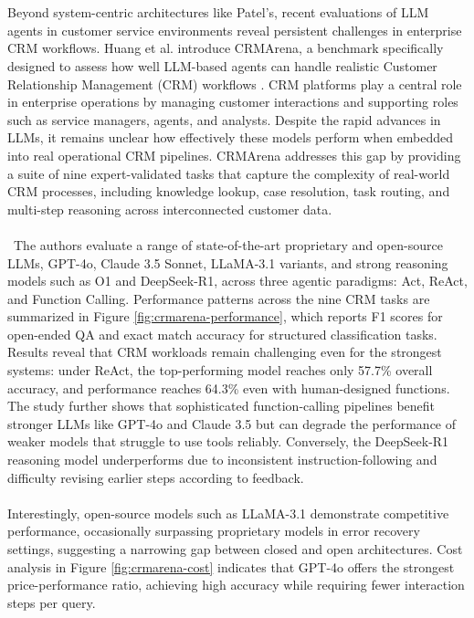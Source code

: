 \\\\
Beyond system-centric architectures like Patel's, recent evaluations of LLM agents in customer service environments reveal persistent challenges in enterprise CRM workflows. Huang et al. introduce CRMArena, a benchmark specifically designed to assess how well LLM-based agents can handle realistic Customer Relationship Management (CRM) workflows \cite{Huang}. CRM platforms play a central role in enterprise operations by managing customer interactions and supporting roles such as service managers, agents, and analysts. Despite the rapid advances in LLMs, it remains unclear how effectively these models perform when embedded into real operational CRM pipelines. CRMArena addresses this gap by providing a suite of nine expert-validated tasks that capture the complexity of real-world CRM processes, including knowledge lookup, case resolution, task routing, and multi-step reasoning across interconnected customer data.
\\\\\
The authors evaluate a range of state-of-the-art proprietary and open-source LLMs, GPT-4o, Claude 3.5 Sonnet, LLaMA-3.1 variants, and strong reasoning models such as O1 and DeepSeek-R1, across three agentic paradigms: Act, ReAct, and Function Calling. Performance patterns across the nine CRM tasks are summarized in Figure \ref{fig:crmarena-performance}, which reports F1 scores for open-ended QA and exact match accuracy for structured classification tasks. Results reveal that CRM workloads remain challenging even for the strongest systems: under ReAct, the top-performing model reaches only 57.7\% overall accuracy, and performance reaches 64.3\% even with human-designed functions. The study further shows that sophisticated function-calling pipelines benefit stronger LLMs like GPT-4o and Claude 3.5 but can degrade the performance of weaker models that struggle to use tools reliably. Conversely, the DeepSeek-R1 reasoning model underperforms due to inconsistent instruction-following and difficulty revising earlier steps according to feedback.
\\\\
Interestingly, open-source models such as LLaMA-3.1 demonstrate competitive performance, occasionally surpassing proprietary models in error recovery settings, suggesting a narrowing gap between closed and open architectures. Cost analysis in Figure \ref{fig:crmarena-cost} indicates that GPT-4o offers the strongest price-performance ratio, achieving high accuracy while requiring fewer interaction steps per query.
